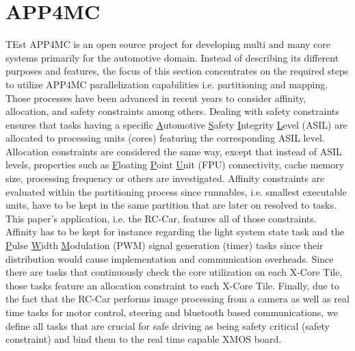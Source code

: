 \documentclass [a4paper,final,conference,10pt]{IDAACS}
\begin{document}
\section{APP4MC}
\label{sec:app4mc}
TEst
APP4MC is an open source project for developing multi and many core systems primarily for the automotive domain. Instead of describing its different purposes and features, the focus of this section concentrates on the required steps to utilize APP4MC parallelization capabilities \cite{ICPDSSE} i.e. partitioning and mapping. Those processes have been advanced in recent years to consider affinity, allocation, and safety constraints among others. Dealing with safety constraints ensures that tasks having a specific \underline{A}utomotive \underline{S}afety \underline{I}ntegrity \underline{L}evel (ASIL) are allocated to processing units (cores) featuring the corresponding ASIL level. Allocation constraints are considered the same way, except that instead of ASIL levels, properties such as \underline{F}loating \underline{P}oint \underline{U}nit (FPU) connectivity, cache memory size, processing frequency or others are investigated. Affinity constraints are evaluated within the partitioning process since runnables, i.e. smallest executable units, have to be kept in the same partition that are later on resolved to tasks. This paper's application, i.e. the RC-Car, features all of those constraints. Affinity has to be kept for instance regarding the light system state task and the \underline{P}ulse \underline{W}idth \underline{M}odulation (PWM) signal generation (timer) tasks since their distribution would cause implementation and communication overheads. Since there are tasks that continuously check the core utilization on each X-Core Tile, those tasks feature an allocation constraint to each X-Core Tile. Finally, due to the fact that the RC-Car performs image processing from a camera as well as real time tasks for motor control, steering and bluetooth based communications, we define all tasks that are crucial for safe driving as being safety critical (safety constraint) and bind them to the real time capable XMOS board. 
\end{document}
